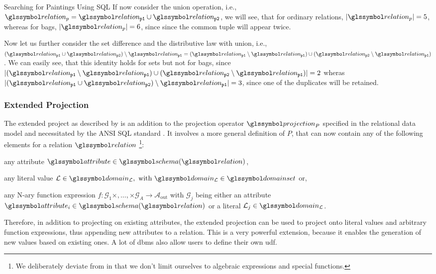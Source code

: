 \begin{example}[label=example:bag_vs_set]{Searching for Paintings Using SQL}{}
    If now consider the union operation, i.e., $\relation_{p} = \relation_{\mathtt{p1}} \cup \relation_{\mathtt{p2}}$, we will see, that for ordinary relations, $|\relation_{p}| = 5$, whereas for bags, $|\relation_{p}| = 6$, since since the common tuple will appear twice.

    Now let us further consider the set difference and the distributive law with union, i.e., $(\relation_{\mathtt{p1}} \cup \relation_{\mathtt{p2}}) \setminus \relation_{\mathtt{p1}} = (\relation_{\mathtt{p1}} \setminus \relation_{\mathtt{p1}}) \cup (\relation_{\mathtt{p2}} \setminus \relation_{\mathtt{p1}})$. We can easily see, that this identity holds for sets but not for bags, since $|(\relation_{\mathtt{p1}} \setminus \relation_{\mathtt{p1}}) \cup (\relation_{\mathtt{p2}} \setminus \relation_{\mathtt{p1}})| = 2$ wheras $|(\relation_{\mathtt{p1}} \cup \relation_{\mathtt{p2}}) \setminus \relation_{\mathtt{p1}}| = 3$, since one of the duplicates will be retained.
\end{example}

\subsubsection{Extended Projection}

The extended project as described by \cite{Garcia:2009Database} is an addition to the projection operator $\projection_{P}$ specified in the relational data model and necessitated by the ANSI SQL standard \cite[]{XOpen:1996SQL}. It involves a more general definition of $P$, that can now contain any of the following elements for a relation $\relation$ \footnote{We deliberately deviate from \cite{Garcia:2009Database} in that we don't limit ourselves to algebraic expressions and special functions.}:
\begin{enumerate*}[label=(\roman*)]
    \item any attribute $\attribute \in \schema(\relation)$,
    \item any literal value $\mathcal{L} \in \domain_{\mathcal{L}}, \text{ with } \domain_{\mathcal{L}} \in \domainset$ or,
    \item any N-ary function expression $f \colon \mathcal{G}_1 \times, \ldots, \times \mathcal{G}_A \rightarrow \mathcal{A}_{\text{out}}$ with $\mathcal{G}_j$ being either an attribute $\attribute_i \in \schema(\relation)$ or a literal $\mathcal{L}_j \in \domain_{\mathcal{L}}$.
\end{enumerate*}

Therefore, in addition to projecting on existing attributes, the extended projection can be used to project onto literal values and arbitrary function expressions, thus appending new attributes to a relation. This is a very powerful extension, because it enables the generation of new values based on existing ones. A lot of \acrshort{dbms} also allow users to define their own \acrfull{udf}.

